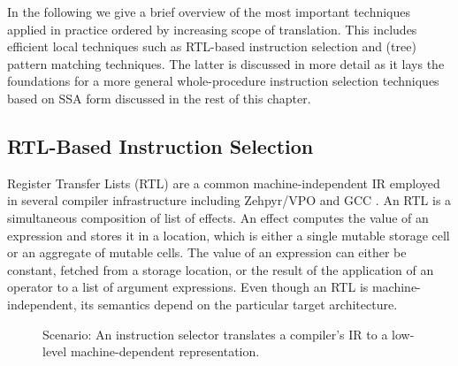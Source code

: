 In the following we give a brief overview of the most important
techniques applied in practice ordered by increasing scope of
translation. This includes efficient local techniques such as
RTL-based instruction selection and (tree) pattern matching
techniques. The latter is discussed in more detail as it lays the
foundations for a more general whole-procedure instruction selection
techniques based on SSA form discussed in the rest of this chapter.

\subsection{RTL-Based Instruction Selection}
Register Transfer Lists (RTL) are a common machine-independent
IR employed in several compiler infrastructure
including Zehpyr/VPO \cite{Ramsey98} and GCC \cite{wwwGCC}. An RTL is a
simultaneous composition of list of effects. An effect computes the
value of an expression and stores it in a location, which is either a
single mutable storage cell or an aggregate of mutable cells. The
value of an expression can either be constant, fetched from a storage
location, or the result of the application of an operator to a list
of argument expressions. Even though an RTL is machine-independent,
its semantics depend on the particular target architecture.

\begin{figure}[t]
  \begin{center}
  \end{center}
  \caption{Scenario: An instruction selector translates a compiler's IR to a
    low-level machine-dependent representation.}
  \label{fig:instruction-selection}
\end{figure}


